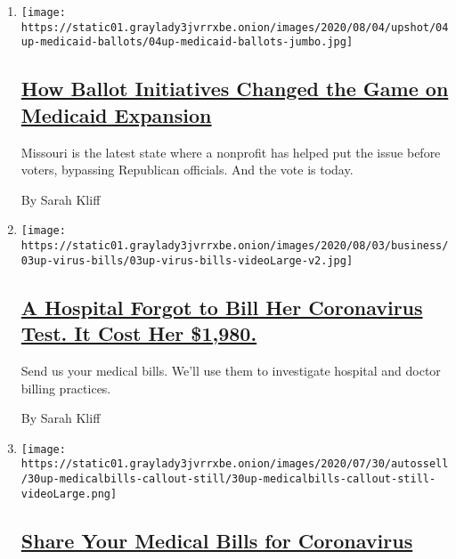 \begin{enumerate}
\def\labelenumi{\arabic{enumi}.}
\item
  \texttt{[image: https://static01.graylady3jvrrxbe.onion/images/2020/08/04/upshot/04up-medicaid-ballots/04up-medicaid-ballots-jumbo.jpg]}

  \hypertarget{how-ballot-initiatives-changed-the-game-on-medicaid-expansion}{%
  \subsection{\texorpdfstring{\href{/2020/08/04/upshot/missouri-election-medicaid-expansion.html}{How
  Ballot Initiatives Changed the Game on Medicaid
  Expansion}}{How Ballot Initiatives Changed the Game on Medicaid Expansion}}\label{how-ballot-initiatives-changed-the-game-on-medicaid-expansion}}

  Missouri is the latest state where a nonprofit has helped put the
  issue before voters, bypassing Republican officials. And the vote is
  today.

  By Sarah Kliff
\item
  \texttt{[image: https://static01.graylady3jvrrxbe.onion/images/2020/08/03/business/03up-virus-bills/03up-virus-bills-videoLarge-v2.jpg]}

  \hypertarget{a-hospital-forgot-to-bill-her-coronavirus-test-it-cost-her-1980}{%
  \subsection{\texorpdfstring{\href{/2020/08/03/upshot/nj-coronavirus-medical-bill.html}{A
  Hospital Forgot to Bill Her Coronavirus Test. It Cost Her
  \$1,980.}}{A Hospital Forgot to Bill Her Coronavirus Test. It Cost Her \$1,980.}}\label{a-hospital-forgot-to-bill-her-coronavirus-test-it-cost-her-1980}}

  Send us your medical bills. We'll use them to investigate hospital and
  doctor billing practices.

  By Sarah Kliff
\item
  \texttt{[image: https://static01.graylady3jvrrxbe.onion/images/2020/07/30/autossell/30up-medicalbills-callout-still/30up-medicalbills-callout-still-videoLarge.png]}

  \hypertarget{share-your-medical-bills-for-coronavirus}{%
  \subsection{\texorpdfstring{\href{/2020/08/03/reader-center/coronavirus-medical-bills.html}{Share
  Your Medical Bills for
  Coronavirus}}{Share Your Medical Bills for Coronavirus}}\label{share-your-medical-bills-for-coronavirus}}


\end{enumerate}
